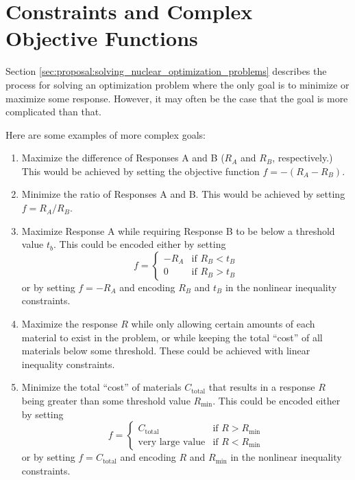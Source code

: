 \section{Constraints and Complex Objective Functions}
\label{sec:proposal:constraints_and_complex_objective_functions}

Section \ref{sec:proposal:solving_nuclear_optimization_problems} describes the process for solving an optimization problem where the only goal is to minimize or maximize some response.
However, it may often be the case that the goal is more complicated than that.

Here are some examples of more complex goals:
\begin{enumerate}
  \item Maximize the difference of Responses A and B ($R_A$ and $R_B$, respectively.)
        This would be achieved by setting the objective function $f = -\left(R_A - R_B\right)$.
  \item Minimize the ratio of Responses A and B.
        This would be achieved by setting $f = R_A/R_B$.
  \item Maximize Response A while requiring Response B to be below a threshold value $t_b$.
        This could be encoded either by setting \[f = \begin{cases} -R_A & \text{if } R_B < t_B \\ 0 & \text{if } R_B > t_B \end{cases}\] or by setting $f = -R_A$ and encoding $R_B$ and $t_B$ in the nonlinear inequality constraints.
  \item Maximize the response $R$ while only allowing certain amounts of each material to exist in the problem, or while keeping the total ``cost'' of all materials below some threshold.
        These could be achieved with linear inequality constraints.
  \item Minimize the total ``cost'' of materials $C_\text{total}$ that results in a response $R$ being greater than some threshold value $R_\text{min}$.
        This could be encoded either by setting \[f = \begin{cases} C_\text{total} & \text{if } R > R_\text{min} \\ \text{very large value} & \text{if } R < R_\text{min} \end{cases}\] or by setting $f = C_\text{total}$ and encoding $R$ and $R_\text{min}$ in the nonlinear inequality constraints.
\end{enumerate}

